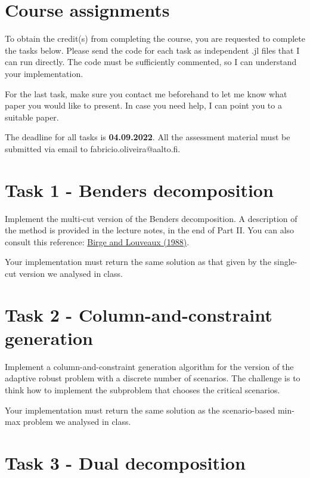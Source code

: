 \documentclass[a4paper]{artikel3}
\begin{document}
\vspace{-10pt}


\section*{Course assignments}

To obtain the credit(s) from completing the course, you are requested to complete the tasks below. Please send the code for each task as independent .jl files that I can run directly. The code must be sufficiently commented, so I can understand your implementation.

For the last task, make sure you contact me beforehand to let me know what paper you would like to present. In case you need help, I can point you to a suitable paper. 

The deadline for all tasks is {\bf 04.09.2022}. All the assessment material must be submitted via email to fabricio.oliveira@aalto.fi. 


\section{Task 1 - Benders decomposition}

Implement the multi-cut version of the Benders decomposition. A description of the method is provided in the lecture notes, in the end of Part II. You can also consult this reference: \href{https://www.sciencedirect.com/science/article/pii/0377221788901592}{Birge and Louveaux (1988)}.

Your implementation must return the same solution as that given by the single-cut version we analysed in class.

 
\section{Task 2 - Column-and-constraint generation}

Implement a column-and-constraint generation algorithm for the version of the adaptive robust problem with a discrete number of scenarios. The challenge is to think how to implement the subproblem that chooses the critical scenarios. 

Your implementation must return the same solution as the scenario-based min-max problem we analysed in class.


\section{Task 3 - Dual decomposition}
\end{document}
